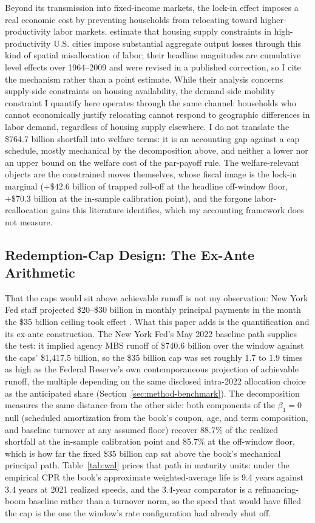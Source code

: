 \documentclass[12pt]{article}
\begin{document}
Beyond its transmission into fixed-income markets, the lock-in effect imposes a real economic cost by preventing households from relocating toward higher-productivity labor markets. \citet{hsieh2019} estimate that housing supply constraints in high-productivity U.S. cities impose substantial aggregate output losses through this kind of spatial misallocation of labor; their headline magnitudes are cumulative level effects over 1964--2009 and were revised in a published correction, so I cite the mechanism rather than a point estimate. While their analysis concerns supply-side constraints on housing availability, the demand-side mobility constraint I quantify here operates through the same channel: households who cannot economically justify relocating cannot respond to geographic differences in labor demand, regardless of housing supply elsewhere. I do not translate the \$764.7 billion shortfall into welfare terms: it is an accounting gap against a cap schedule, mostly mechanical by the decomposition above, and neither a lower nor an upper bound on the welfare cost of the par-payoff rule. The welfare-relevant objects are the constrained moves themselves, whose fiscal image is the lock-in marginal ($+\$42.6$ billion of trapped roll-off at the headline off-window floor, $+\$70.3$ billion at the in-sample calibration point), and the forgone labor-reallocation gains this literature identifies, which my accounting framework does not measure.

\subsection{Redemption-Cap Design: The Ex-Ante Arithmetic}\label{sec:discussion-capdesign}

That the caps would sit above achievable runoff is not my observation: New York Fed staff projected \$20--\$30 billion in monthly principal payments in the month the \$35 billion ceiling took effect \citep{nyfed2022}. What this paper adds is the quantification and its ex-ante construction. The New York Fed's May 2022 baseline path supplies the test: it implied agency MBS runoff of \$740.6 billion over the window against the caps' \$1{,}417.5 billion, so the \$35 billion cap was set roughly 1.7 to 1.9 times as high as the Federal Reserve's own contemporaneous projection of achievable runoff, the multiple depending on the same disclosed intra-2022 allocation choice as the anticipated share (Section~\ref{sec:method-benchmark}). The decomposition measures the same distance from the other side: both components of the $\beta_1 = 0$ null (scheduled amortization from the book's coupon, age, and term composition, and baseline turnover at any assumed floor) recover 88.7\% of the realized shortfall at the in-sample calibration point and 85.7\% at the off-window floor, which is how far the fixed \$35 billion cap sat above the book's mechanical principal path. Table~\ref{tab:wal} prices that path in maturity units: under the empirical CPR the book's approximate weighted-average life is 9.4 years against 3.4 years at 2021 realized speeds, and the 3.4-year comparator is a refinancing-boom baseline rather than a turnover norm, so the speed that would have filled the cap is the one the window's rate configuration had already shut off.
\end{document}
